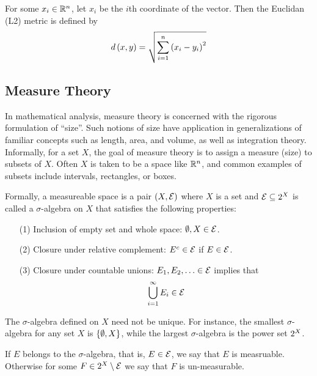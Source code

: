 \begin{example}
  For some \(x_i \in \mathbb{R}^n\),
  let \(x_i\) be the \(i\)th coordinate of the vector.
  Then the Euclidan (L2) metric is defined by
  \begin{align*}
    d\left(x, y\right)
      = \sqrt{\sum_{i = 1}^{n} \left(x_i - y_i\right)^2}
  \end{align*}
\end{example}


\subsection{Measure Theory}

In mathematical analysis, measure theory is concerned with
the rigorous formulation of ``size''.
Such notions of size have application in generalizations of
familiar concepts such as length, area, and volume,
as well as integration theory.
Informally, for a set \(X\),
the goal of measure theory is to assign a measure (size) to subsets of \(X\).
Often \(X\) is taken to be a space like \(\mathbb{R}^n\),
and common examples of subsets include intervals, rectangles, or boxes.


Formally, a measureable space is a pair
\(\left(X, \mathcal{E}\right)\) where
\(X\) is a set and \(\mathcal{E} \subseteq 2^{X}\) is called
a \(\sigma\)-algebra on \(X\) that satisfies the following properties:
\begin{enumerate}
  \item[(1)]
    Inclusion of empty set and whole space: \(\emptyset, X \in \mathcal{E}\).

  \item[(2)]
    Closure under relative complement:
    \(E^c \in \mathcal{E}\) if \(E \in \mathcal{E}\).

  \item[(3)]
    Closure under countable unions:
    \(E_1, E_2, \ldots \in \mathcal{E}\) implies that
    \begin{align*}
      \bigcup_{i = 1}^{\infty} E_i \in \mathcal{E}
    \end{align*}

\end{enumerate}

The \(\sigma\)-algebra defined on \(X\) need not be unique.
For instance, the smallest \(\sigma\)-algebra for any set \(X\)
is \(\left\{\emptyset, X\right\}\),
while the largest \(\sigma\)-algebra is the power set \(2^{X}\).

If \(E\) belongs to the \(\sigma\)-algebra,
that is, \(E \in \mathcal{E}\), we say that \(E\) is measruable.
Otherwise for some \(F \in 2^{X} \setminus \mathcal{E}\)
we say that \(F\) is un-measurable.

